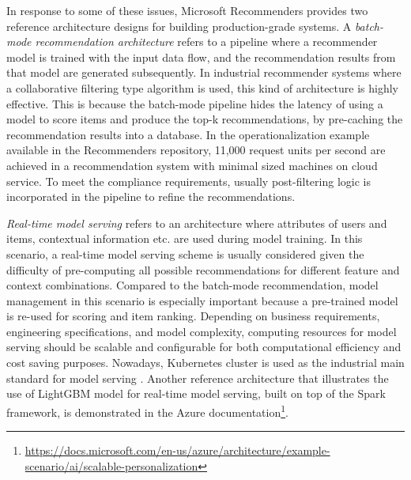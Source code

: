 %
In response to some of these issues, 
Microsoft Recommenders provides two reference architecture designs for building production-grade systems. 
A \textit{batch-mode recommendation architecture} refers to a pipeline where a recommender model is trained with the input data flow, and the recommendation results from that model are generated subsequently. 
In industrial recommender systems where a collaborative filtering type algorithm is used, 
this kind of architecture is highly effective. This is because the batch-mode pipeline 
hides the latency of using a model to score items and produce the top-k recommendations, 
by pre-caching the recommendation results into a database. 
In the operationalization example available in the Recommenders repository, 
11,000 request units per second are achieved in a recommendation system with minimal sized machines on cloud service. 
To meet the compliance requirements, usually post-filtering logic is incorporated in the pipeline to refine the recommendations.

\textit{Real-time model serving} refers to an architecture where attributes of users and items, contextual information etc. are used during model training. In this scenario, a real-time model serving scheme is usually considered given the difficulty of pre-computing all possible recommendations for different feature and context combinations. Compared to the batch-mode recommendation, model management in this scenario is especially important because a pre-trained model is re-used for scoring and item ranking. Depending on business requirements, engineering specifications, and model complexity, computing resources for model serving should be scalable and configurable for both computational efficiency and cost saving purposes. Nowadays, Kubernetes cluster is used as the industrial main standard for model serving \cite{bernstein2014containers}. Another reference architecture that illustrates the use of LightGBM model \cite{ke2017lightgbm} for real-time model serving, built on top of the Spark framework, is demonstrated in the Azure documentation\footnote{\url{https://docs.microsoft.com/en-us/azure/architecture/example-scenario/ai/scalable-personalization}}.
